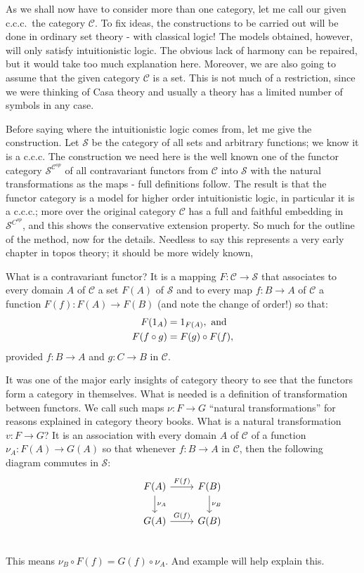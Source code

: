 \documentclass[12pt]{article}
\def\to{\rightarrow}
\def\id{{\textrm 1}}
\def\comp{\circ}
\def\ccc{{c.c.c.}}
\def\C{\mathcal C}
\def\S{\mathcal S}
\def\scop{\S^{\C^{op}}}
\begin{document}
As we shall now have to consider more than one category, let me call our given \ccc\ the category $\C$. To fix ideas, the constructions to be carried out will be done in ordinary set theory - with classical logic! The models obtained, however, will only satisfy intuitionistic logic. The obvious lack of harmony can be repaired, but it would take too much explanation here.	Moreover, we are also going to assume that the given category $\C$ is a set. This is not much of a restriction, since we were thinking of Casa theory and usually a theory has a limited number of symbols in any case.

Before saying where the intuitionistic logic comes from, let me give the construction. Let $\S$ be the category of all sets and arbitrary functions; we know it is a c.c.c. The construction we need here is the well known one of the functor category $\scop$ of all contravariant functors from $\C$ into $\S$ with the natural transformations as the maps - full definitions follow. The result is that the functor category is a model for higher order intuitionistic logic, in particular it is a \ccc; more over the original category $\C$ has a full and faithful embedding in $\S^{C^{op}}$, and this shows the conservative extension property. So much for the outline of the method, now for the details. Needless to say this represents a very early chapter in topos theory; it should be more widely known,

What is a contravariant functor? It is a mapping $F: \C\to \S$ that associates to every domain $A$ of $\C$ a set $F(A)$ of $\S$ and to every map $f: B \to A$ of $\C$ a function $F(f) : F(A) \to F(B)$ (and note the change of order!) so that:
\begin{align*}
F(\id_A) &= \id_{F(A)} , {\textrm{ and}}\\
F(f \comp g) &= F(g) \comp F(f),
\end{align*}
%
provided $f: B\to A$ and $g: C \to B$ in $\C$.

It was one of the major early insights of category theory to see that the functors form
a category in themselves. What is needed is a definition of transformation between functors. We call such maps $\nu : F \to G$ ``natural transformations'' for reasons explained in category theory books. What is a natural transformation $v : F\to G$? It is an association with every domain $A$ of $\C$ of a function $\nu_A: F(A)\to G(A)$ so that whenever $f : B \to A$ in $\C$, then the following diagram commutes in $\S$:
\[
  \begin{tikzcd}
    F(A) \arrow{d}{\nu_A} \arrow{r}{F(f)}  & F(B) \arrow{d}{\nu_B} \\
    G(A)  \arrow{r}{G(f)} & G(B)\\
  \end{tikzcd}
\]
This means $\nu_B \comp F(f) = G(f) \comp \nu_A$. And example will help explain this.
\end{document}
